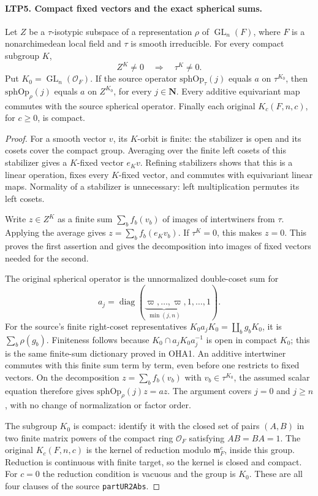\paragraph{LTP5. Compact fixed vectors and the exact spherical sums.}
\label{claim:LTP5}
Let \(Z\) be a \(\tau\)-isotypic subspace of a representation
\(\rho\) of \(\operatorname{GL}_n(F)\), where \(F\) is a
nonarchimedean local field and \(\tau\) is smooth irreducible.
For every compact subgroup \(K\),
\[
               Z^K\ne0\quad\Longrightarrow\quad\tau^K\ne0 .
\]
Put \(K_0=\operatorname{GL}_n(\mathcal O_F)\).  If the source
operator \(\mathrm{sphOp}_{\tau}(j)\) equals \(a\) on \(\tau^{K_0}\),
then \(\mathrm{sphOp}_{\rho}(j)\) equals \(a\) on \(Z^{K_0}\),
for every \(j\in\mathbf N\).  Every additive equivariant map
commutes with the source spherical operator.  Finally each original
\(K_c(F,n,c)\), for \(c\ge0\), is compact.
\begin{proof}
For a smooth vector \(v\), its \(K\)-orbit is finite: the stabilizer
is open and its cosets cover the compact group.  Averaging over the
finite left cosets of this stabilizer gives a \(K\)-fixed vector
\(e_Kv\).  Refining stabilizers shows that this is a linear operation,
fixes every \(K\)-fixed vector, and commutes with equivariant linear
maps.  Normality of a stabilizer is unnecessary: left multiplication
permutes its left cosets.

Write \(z\in Z^K\) as a finite sum \(\sum_b f_b(v_b)\) of images of
intertwiners from \(\tau\).  Applying the average gives
\(z=\sum_bf_b(e_Kv_b)\).  If \(\tau^K=0\), this makes \(z=0\).
This proves the first assertion and gives the decomposition into
images of fixed vectors needed for the second.

The original spherical operator is the unnormalized double-coset
sum for
\[
 a_j=\operatorname{diag}
       (\underbrace{\varpi,\ldots,\varpi}_{\min(j,n)},
        1,\ldots,1).
\]
For the source's finite right-coset representatives
\(K_0a_jK_0=\coprod_b g_bK_0\), it is
\(\sum_b\rho(g_b)\).  Finiteness follows because
\(K_0\cap a_jK_0a_j^{-1}\) is open in compact \(K_0\);
this is the same finite-sum dictionary proved in OHA1.
An additive intertwiner commutes with this finite sum term by
term, even before one restricts to fixed vectors.  On the
decomposition \(z=\sum_bf_b(v_b)\) with \(v_b\in\tau^{K_0}\),
the assumed scalar equation therefore gives
\(\mathrm{sphOp}_\rho(j)z=az\).
The argument covers \(j=0\) and \(j\ge n\), with no change of
normalization or factor order.

The subgroup \(K_0\) is compact: identify it with the closed set of
pairs \((A,B)\) in two finite matrix powers of the compact ring
\(\mathcal O_F\) satisfying \(AB=BA=1\).
The original \(K_c(F,n,c)\) is the kernel of reduction modulo
\(\mathfrak m_F^c\), inside this group.  Reduction is continuous
with finite target, so the kernel is closed and compact.
For \(c=0\) the reduction condition is vacuous and the group is
\(K_0\).  These are all four clauses of the source
\texttt{partUR2Abs}.
\end{proof}

